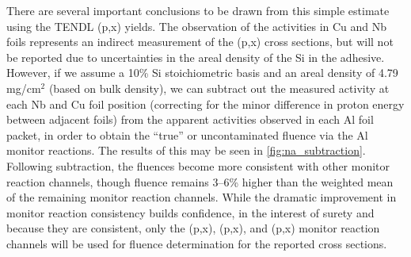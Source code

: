 \documentclass[3p]{elsarticle}
\begin{document}
There are several important  conclusions to be drawn from this simple estimate using the TENDL   (p,x) yields.
The observation of the  activities in Cu and Nb foils  represents an indirect measurement of the (p,x) cross sections, but  will not be reported due to 
uncertainties in the areal density of the Si in the adhesive.
However, if we assume a 10\% Si stoichiometric basis and an areal density of 4.79\,mg/cm$^2$ (based on bulk density),
we can subtract out the measured  activity at each Nb and Cu foil position (correcting for the minor difference in proton energy between adjacent foils) from the apparent   activities observed in each Al foil packet, in order to obtain the \enquote{true} or uncontaminated fluence via the Al monitor reactions.
The results of this  may be seen in \autoref{fig:na_subtraction}.
Following subtraction, the  fluences become more consistent with other monitor reaction channels, 
though   fluence remains 3--6\% higher than the weighted mean of the remaining monitor reaction channels.
While the dramatic improvement in monitor reaction consistency builds confidence, in the interest of surety and because they are consistent, only the (p,x), (p,x), and (p,x) monitor reaction channels will be used for fluence determination for the reported cross sections.
\end{document}
